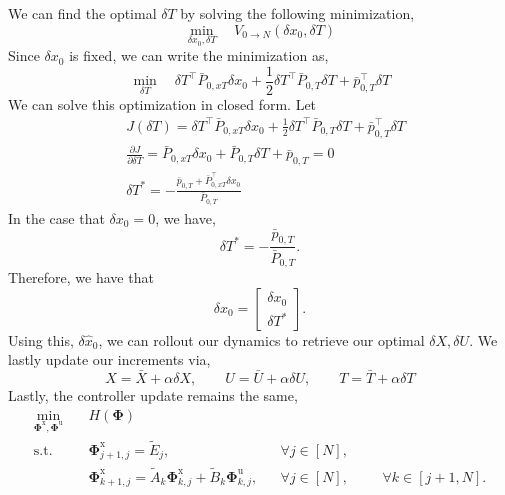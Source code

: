 \documentclass{article}
\begin{document}
We can find the optimal $\delta T$ by solving the following minimization,
\begin{equation}
    \min_{\delta x_0, \delta T} \quad V_{0 \rightarrow N} (\delta x_0, \delta T)
\end{equation}
Since $\delta x_0$ is fixed, we can write the minimization as,
\begin{equation}
    \min_{\delta T} \quad \delta T^\top \bar P_{0, xT} \delta x_0 + \frac{1}{2} \delta T^\top \bar P_{0, T} \delta T  + \bar p_{0, T}^\top \delta T
\end{equation}
We can solve this optimization in closed form. Let
\begin{subequations}
    \begin{align}
        & J(\delta T) = \delta T^\top \bar P_{0, xT} \delta x_0 + \frac{1}{2} \delta T^\top \bar P_{0, T} \delta T  + \bar p_{0, T}^\top \delta T \\
        & \frac{\partial J}{\partial \delta T} = \bar P_{0, xT} \delta x_0 + \bar P_{0, T} \delta T  + \bar p_{0, T} = 0 \\
        & \delta T^* = - \frac{\bar p_{0,T} +  \bar P_{0,xT}^\top \delta x_0}{\bar P_{0, T}}
    \end{align}
\end{subequations}
In the case that $\delta x_0 = 0$, we have,
\begin{equation}
    \delta T^* = - \frac{\bar p_{0,T}}{\bar P_{0,T}}.
\end{equation}
Therefore, we have that
\begin{equation}
    \delta \hat x_0 = \begin{bmatrix}
        \delta x_0 \\
        \delta T^*
    \end{bmatrix}.
\end{equation}
Using this, $\delta \hat x_0$, we can rollout our dynamics to retrieve our optimal $\delta X, \delta U$. We lastly update our increments via,
\begin{equation}
    X = \bar X + \alpha \delta X, \qquad U = \bar U + \alpha \delta U, \qquad T = \bar T + \alpha \delta T
\end{equation}
Lastly, the controller update remains the same,
\begin{subequations}
    \begin{align}
        \min_{\mathbf{\Phi}^\text{x}, \mathbf{\Phi}^\text{u}} \quad & H(\mathbf{\Phi}) \\
        \text{s.t.} \quad
        & \mathbf{\Phi}^\text{x}_{j+1, j} = \tilde E_j, &&\forall j \in [N], \\
        & \mathbf{\Phi}^\text{x}_{k+1, j} = \tilde A_k \mathbf{\Phi}^\text{x}_{k,j} + \tilde B_k \mathbf{\Phi}^\text{u}_{k,j}, && \forall j \in [N], &&& \forall k \in [j + 1, N].
    \end{align}
\end{subequations}
\end{document}
